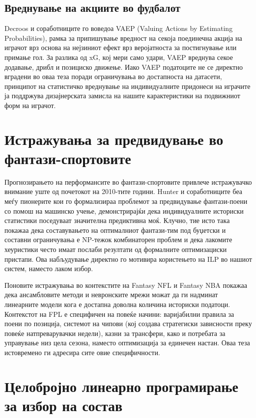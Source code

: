 \subsection{Вреднување на акциите во фудбалот}

Decroos и соработниците \cite{decroos2019vaep} го воведоа VAEP (Valuing Actions by Estimating Probabilities), рамка за припишување вредност на секоја поединечна акција на играчот врз основа на нејзиниот ефект врз веројатноста за постигнување или примање гол. За разлика од xG, кој мери само удари, VAEP вреднува секое додавање, дрибл и позициско движење. Иако VAEP податоците не се директно вградени во оваа теза поради ограничувања во достапноста на датасети, принципот на статистичко вреднување на индивидуалните придонеси на играчите ја поддржува дизајнерската замисла на нашите карактеристики на подвижниот форм на играчот.

\section{Истражувања за предвидување во фантази-спортовите}

Прогнозирањето на перформансите во фантази-спортовите привлече истражувачко внимание уште од почетокот на 2010-тите години. Hunter и соработниците \cite{hunter2012fantasy} беа меѓу пионерите кои го формализираа проблемот за предвидување фантази-поени со помош на машинско учење, демонстрирајќи дека индивидуалните историски статистики поседуваат значителна предиктивна моќ. Клучно, тие исто така покажаа дека составувањето на оптималниот фантази-тим под буџетски и составни ограничувања е NP-тежок комбинаторен проблем и дека лакомите хеуристики често имаат послаби резултати од формалните оптимизациски пристапи. Ова набљудување директно го мотивира користењето на ILP во нашиот систем, наместо лаком избор.

Поновите истражувања во контекстите на Fantasy NFL и Fantasy NBA покажаа дека ансамбловите методи и невронските мрежи можат да ги надминат линеарните модели кога е достапна доволна количина историски податоци. Контекстот на FPL е специфичен на повеќе начини: варијабилни правила за поени по позиција, системот на чипови (кој создава стратегиски зависности преку повеќе натпреварувачки недели), казни за трансфери, како и потребата за управување низ цела сезона, наместо оптимизација за единечен настан. Оваа теза истовремено ги адресира сите овие специфичности.

\section{Целобројно линеарно програмирање за избор на состав}

